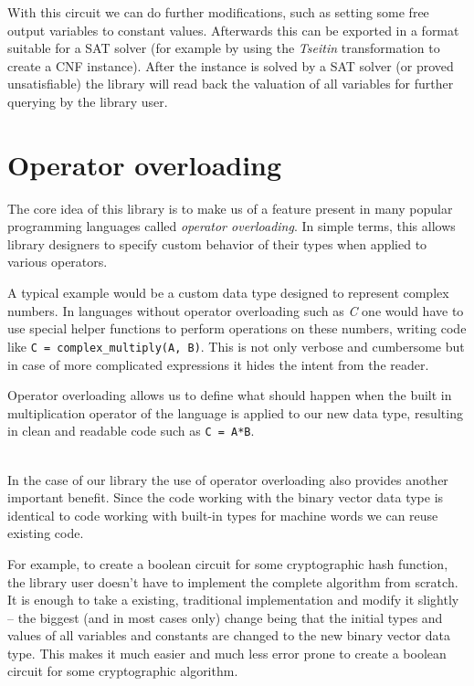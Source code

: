 With this circuit we can do further modifications, such as setting some free output variables to constant values.
Afterwards this can be exported in a format suitable for a SAT solver (for example by using the \emph{Tseitin} transformation to create a CNF instance).
After the instance is solved by a SAT solver (or proved unsatisfiable) the library will read back the valuation of all variables for further querying by the library user.

\section{Operator overloading}

The core idea of this library is to make us of a feature present in many popular programming languages called \emph{operator overloading}.
In simple terms, this allows library designers to specify custom behavior of their types when applied to various operators.

A typical example would be a custom data type designed to represent complex numbers.
In languages without operator overloading such as \emph{C} one would have to use special helper functions to perform operations on these numbers, writing code like \texttt{C = complex\_multiply(A, B)}.
This is not only verbose and cumbersome but in case of more complicated expressions it hides the intent from the reader.

Operator overloading allows us to define what should happen when the built in multiplication operator of the language is applied to our new data type, resulting in clean and readable code such as \texttt{C = A*B}.

~ \\

In the case of our library the use of operator overloading also provides another important benefit.
Since the code working with the binary vector data type is identical to code working with built-in types for machine words we can reuse existing code.

For example, to create a boolean circuit for some cryptographic hash function, the library user doesn't have to implement the complete algorithm from scratch.
It is enough to take a existing, traditional implementation and modify it slightly -- the biggest (and in most cases only) change being that the initial types and values of all variables and constants are changed to the new binary vector data type.
This makes it much easier and much less error prone to create a boolean circuit for some cryptographic algorithm.

